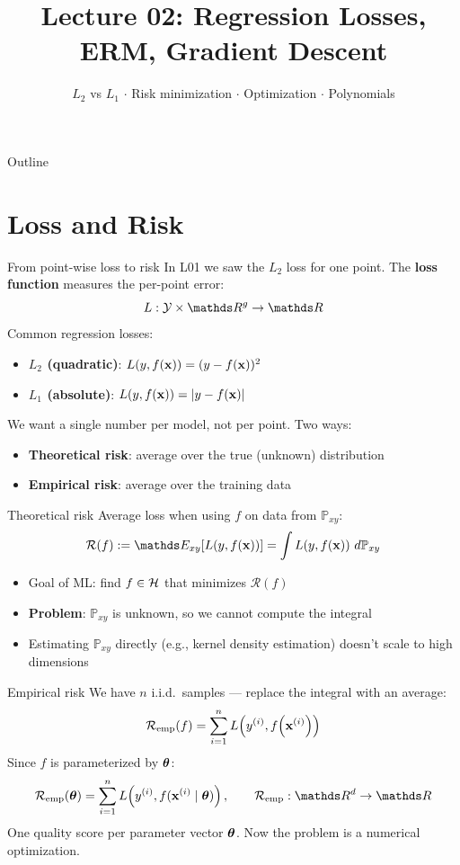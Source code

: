 \documentclass[aspectratio=169]{beamer}
\title{Lecture 02: Regression Losses, ERM, Gradient Descent}
\subtitle{$L_2$ vs $L_1$ $\cdot$ Risk minimization $\cdot$ Optimization $\cdot$ Polynomials}
\date{}
\begin{document}
\begin{frame}{Outline}
  \tableofcontents
\end{frame}

\section{Loss and Risk}

\begin{frame}{From point-wise loss to risk}
  In L01 we saw the $L_2$ loss for one point. The \textbf{loss function} measures the per-point error:
  \[
    L : \Yspace \times \R^g \to \R
  \]
  \vfill
  Common regression losses:
  \begin{itemize}
    \item \textbf{$L_2$ (quadratic)}: $L\!\left(y, f(\mathbf{x})\right) = (y - f(\mathbf{x}))^2$
    \item \textbf{$L_1$ (absolute)}: $L\!\left(y, f(\mathbf{x})\right) = |y - f(\mathbf{x})|$
  \end{itemize}
  \vfill
  We want a single number per model, not per point. Two ways:
  \begin{itemize}
    \item \textbf{Theoretical risk}: average over the true (unknown) distribution
    \item \textbf{Empirical risk}: average over the training data
  \end{itemize}
\end{frame}

\begin{frame}{Theoretical risk}
  Average loss when using $f$ on data from $\mathbb{P}_{xy}$:
  \[
    \mathcal{R}(f) := \E_{xy}[\Lxy] = \int \Lxy \, d\mathbb{P}_{xy}
  \]
  \vfill
  \begin{itemize}
    \item Goal of ML: find $f \in \mathcal{H}$ that minimizes $\mathcal{R}(f)$
    \item \textbf{Problem}: $\mathbb{P}_{xy}$ is unknown, so we cannot compute the integral
    \item Estimating $\mathbb{P}_{xy}$ directly (e.g., kernel density estimation) doesn't scale to high dimensions
  \end{itemize}
\end{frame}

\begin{frame}{Empirical risk}
  We have $n$ i.i.d.\ samples — replace the integral with an average:
  \[
    \mathcal{R}_{\text{emp}}(f) = \sum_{i=1}^{n} L\!\left(y^{(i)}, f\!\left(\mathbf{x}^{(i)}\right)\right)
  \]
  \vfill
  Since $f$ is parameterized by $\bm{\theta}$:
  \[
    \risket = \sumin L\!\left(\yi, f(\xv^{(i)} \mid \thetav)\right),
    \qquad \riske : \R^d \to \R
  \]
  \vfill
  One quality score per parameter vector $\bm{\theta}$. Now the problem is a numerical optimization.
\end{frame}
\end{document}
